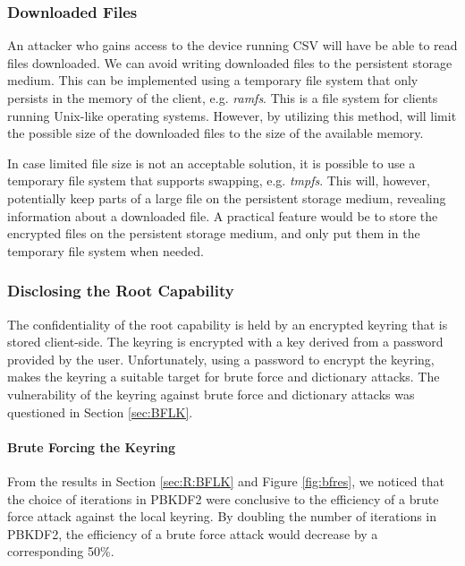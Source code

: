 \documentclass[pdftex,english,10pt,b5paper,twoside]{book}
\begin{document}
\subsubsection{Downloaded Files} 

An attacker who gains access to the device running \ac{CSV} will have be able
to read files downloaded. We can avoid writing downloaded files to the
persistent storage medium. This can be implemented using a temporary file
system that only persists in the memory of the client, e.g. \emph{ramfs}. This
is a file system for clients running Unix-like operating systems.  However, by
utilizing this method, will limit the possible size of the downloaded files to
the size of the available memory. 

In case limited file size is not an acceptable solution, it is possible to use
a temporary file system that supports swapping, e.g. \emph{tmpfs}.  This will,
however, potentially keep parts of a large file on the persistent storage
medium, revealing information about a downloaded file. A practical feature
would be to store the encrypted files on the persistent storage medium, and
only put them in the temporary file system when needed. 

\subsubsection{Disclosing the Root Capability}

The confidentiality of the root capability is held by an encrypted keyring that
is stored client-side. The keyring is encrypted with a key derived from a
password provided by the user. Unfortunately, using a password to encrypt the
keyring, makes the keyring a suitable target for brute force and dictionary
attacks. The vulnerability of the keyring against brute force and dictionary
attacks was questioned in Section \ref{sec:BFLK}.

\paragraph{Brute Forcing the Keyring} From the results in Section
\ref{sec:R:BFLK} and Figure \ref{fig:bfres}, we noticed that the choice of
iterations in \ac{PBKDF2} were conclusive to the efficiency of a brute force
attack against the local keyring. By doubling the number of iterations in
\ac{PBKDF2}, the efficiency of a brute force attack would decrease by a
corresponding 50\%.
\end{document}

